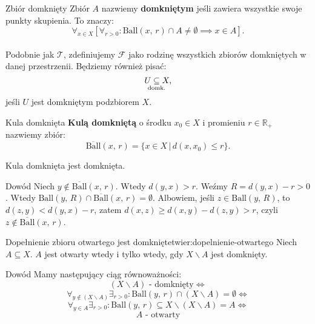 \documentclass{article}
\newcounter{defi}
\numberwithin{defi}{section}
\numberwithin{theo}{section}
\numberwithin{defi}{section}
\newcommand{\R}{\mathbb{R}}
\newcommand{\Tau}{\mathcal{T}}
\newcommand{\Fau}{\mathcal{F}}
\newcommand{\subdomk}{\underset{\clap{\scriptsize domk.}}{\subseteq}}
\newcommand{\ball}[2]{\text{Ball}(#1, \, #2)}
\newcommand{\dball}[2]{\overline{\text{Ball}}(#1, \, #2)}
\begin{document}
\begin{defr}{Zbiór domknięty}
    Zbiór $A$ nazwiemy \textbf{domkniętym} jeśli zawiera wszystkie swoje punkty skupienia. To znaczy: \begin{equation}
        \forall_{x \in X} [\forall_{r>0}: \ball{x}{r} \cap A \neq \emptyset \implies x \in A].
    \end{equation}
    \\
    Podobnie jak $\Tau$, zdefiniujemy $\Fau$ jako rodzinę wszystkich zbiorów domkniętych w danej przestrzenii. Będziemy również pisać:
    \begin{equation}
        U \subdomk X,
    \end{equation}
    jeśli $U$ jest domkniętym podzbiorem $X$.
\end{defr}

\begin{defr}{Kula domknięta}
    \textbf{Kulą domkniętą} o środku $x_0 \in X$ i promieniu $r \in \R_+$ nazwiemy zbiór: \begin{equation}
        \dball{x}{r} = \{ x\in X \, | \, d(x, x_0) \leqslant r\}.
    \end{equation}
\end{defr}

\begin{twier}{}
    Kula domknięta jest domknięta.
\end{twier}

\begin{dow}{Dowód}
    Niech $y \notin \dball{x}{r}$. Wtedy $d(y, x) > r$. Weźmy $R = d(y, x) - r > 0$. Wtedy $\ball{y}{R} \cap \dball{x}{r} = \emptyset$. Albowiem, jeśli $z \in \ball{y}{R}$, to $d(z, y) <  d(y, x) - r $, zatem $d(x, z) \geqslant d(x, y) - d(z, y)  > r$, czyli $z \notin \dball{x}{r}$.
\end{dow}

\begin{twier}{Dopełnienie zbioru otwartego jest domknięte}{twier:dopelnienie-otwartego}
    Niech $A \subseteq X$. $A$ jest otwarty wtedy i tylko wtedy, gdy $X \backslash A$ jest domknięty.
\end{twier}



\begin{dow}{Dowód}
    Mamy następujący ciąg równoważności:
    \begin{equation}
        (X \backslash A) \text{ - domknięty} \iff
    \end{equation}
    \begin{equation}
        \forall_{y \notin (X \backslash A)} \exists_{r > 0}: \ball{y}{r} \cap (X \backslash A) =  \emptyset \iff
    \end{equation}
    \begin{equation}
        \forall_{y \in A} \exists_{r > 0}: \ball{y}{r} \subseteq X \backslash (X \backslash A) = A \iff
    \end{equation}
    \begin{equation}
        A \text{ - otwarty}
    \end{equation}
\end{dow}
\end{document}
